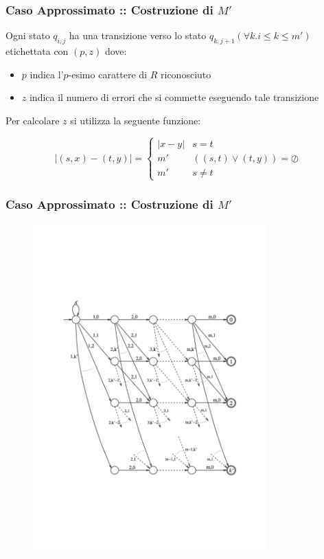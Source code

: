 \documentclass{beamer}
\begin{document}
\begin{frame}
\frametitle{Caso Approssimato :: Costruzione di $M'$}
Ogni stato $q_{i,j}$ ha una transizione verso lo stato $q_{k,j+1} (\forall k . i \leq k \leq m')$ etichettata con $(p,z)$ dove: 
\begin{itemize}
\item $p$ indica l'$p$-esimo carattere di $R$ riconosciuto
\item $z$ indica il numero di errori che si commette eseguendo tale transizione
\end{itemize}

Per calcolare $z$ si utilizza la seguente funzione:

\begin{equation*}
|(s,x) - (t,y)|= 
\begin{cases} 
|x-y| & \text{$s = t$}
\\
m'  &\text{$((s,t) \vee (t,y)) = \oslash$}
\\
m'  &\text{$s \not= t $}
\end{cases}
\end{equation*}


\end{frame}

\begin{frame}
\frametitle{Caso Approssimato :: Costruzione di $M'$}

\begin{figure}[p]
\vspace*{-3cm}
    \includegraphics[width=0.8\textwidth]{aprox_count.pdf}
\end{figure}

\end{frame}
\end{document}
